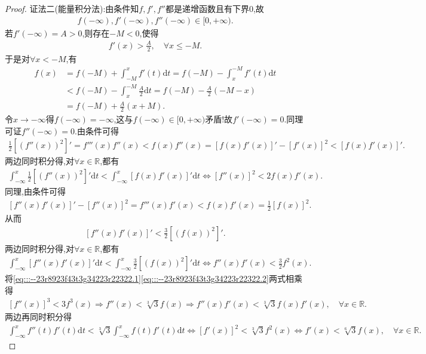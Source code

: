 \documentclass[../../main.tex]{subfiles}%
\begin{document}
\begin{proof}
{\color{blue}证法二(能量积分法):}由条件知$f,f',f''$都是递增函数且有下界$0$,故
\begin{align*}
f(-\infty),f'(-\infty),f''(-\infty)\in [0,+\infty).
\end{align*}
若$f'(-\infty)=A>0$,则存在$-M<0$,使得
\begin{align*}
f'(x)>\frac{A}{2},\quad \forall x\leqslant -M.
\end{align*}
于是对$\forall x<-M$,有
\begin{align*}
f\left( x \right) &=f\left( -M \right) +\int_{-M}^x{f' \left( t \right) \mathrm{d}t}=f\left( -M \right) -\int_x^{-M}{f' \left( t \right) \mathrm{d}t}
\\
&<f\left( -M \right) -\int_x^{-M}{\frac{A}{2}\mathrm{d}t}=f\left( -M \right) -\frac{A}{2}\left( -M-x \right) 
\\
&=f\left( -M \right) +\frac{A}{2}\left( x+M \right) .
\end{align*}
令$x\rightarrow -\infty$得$f(-\infty)=-\infty$,这与$f(-\infty)\in [0,+\infty)$矛盾!故$f'(-\infty)=0$.同理可证$f''(-\infty)=0$.由条件可得
\begin{align*}
\frac{1}{2}\left[ \left( f''(x) \right)^2 \right]'=f'''(x)f''(x)<f(x)f''(x)=\left[ f(x)f'(x) \right]'-\left[ f'(x) \right]^2<\left[ f(x)f'(x) \right]'.
\end{align*}
两边同时积分得,对$\forall x\in \mathbb{R}$,都有
\begin{align}
\int_{-\infty}^x \frac{1}{2}\left[ \left( f''(x) \right)^2 \right]'\mathrm{d}t<\int_{-\infty}^x \left[ f(x)f'(x) \right]'\mathrm{d}t\Longleftrightarrow \left[ f''(x) \right]^2<2f(x)f'(x). \label{eq:::--23r8923f43t3g34223r22322.1}
\end{align}
同理,由条件可得
\begin{align*}
\left[ f''(x)f'(x) \right]'-\left[ f''(x) \right]^2=f'''(x)f'(x)<f(x)f'(x)=\frac{1}{2}\left[ f(x) \right]^2.
\end{align*}
从而
\begin{align*}
\left[ f''(x)f'(x) \right]'<\frac{3}{2}\left[ \left( f(x) \right)^2 \right]'.
\end{align*}
两边同时积分得,对$\forall x\in \mathbb{R}$,都有
\begin{align}
\int_{-\infty}^x \left[ f''(x)f'(x) \right]'\mathrm{d}t<\int_{-\infty}^x \frac{3}{2}\left[ \left( f(x) \right)^2 \right]'\mathrm{d}t\Longleftrightarrow f''(x)f'(x)<\frac{3}{2}f^2(x). \label{eq:::--23r8923f43t3g34223r22322.2}
\end{align}
将\eqref{eq:::--23r8923f43t3g34223r22322.1}\eqref{eq:::--23r8923f43t3g34223r22322.2}两式相乘得
\begin{align*}
\left[ f''(x) \right]^3<3f^3(x)\Longrightarrow f''(x)<\sqrt[3]{3}f(x)\Longrightarrow f''(x)f'(x)<\sqrt[3]{3}f(x)f'(x),\quad \forall x\in \mathbb{R}.
\end{align*}
两边再同时积分得
\begin{align*}
\int_{-\infty}^x f''(t)f'(t)\mathrm{d}t<\sqrt[3]{3}\int_{-\infty}^x f(t)f'(t)\mathrm{d}t\Longleftrightarrow \left[ f'(x) \right]^2<\sqrt[3]{3}f^2(x)\Longleftrightarrow f'(x)<\sqrt[6]{3}f(x),\quad \forall x\in \mathbb{R}.
\end{align*}

\end{proof}
\end{document}
